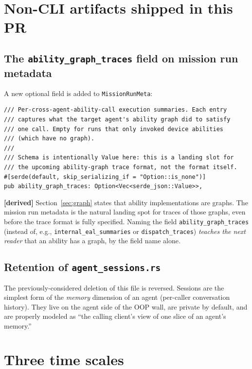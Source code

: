 \documentclass[11pt,a4paper]{article}
\newcommand{\derived}{\textcolor{derivedcolor}{\textbf{[derived]}}\xspace}
\begin{document}
\section{Non-CLI artifacts shipped in this PR}
\label{sec:non-cli}

\subsection{The \texttt{ability\_graph\_traces} field on mission run metadata}

A new optional field is added to \texttt{MissionRunMeta}:

\begin{lstlisting}
/// Per-cross-agent-ability-call execution summaries. Each entry
/// captures what the target agent's ability graph did to satisfy
/// one call. Empty for runs that only invoked device abilities
/// (which have no graph).
///
/// Schema is intentionally Value here: this is a landing slot for
/// the upcoming ability-graph trace format, not the format itself.
#[serde(default, skip_serializing_if = "Option::is_none")]
pub ability_graph_traces: Option<Vec<serde_json::Value>>,
\end{lstlisting}

\derived{} Section~\ref{sec:graph} states that ability implementations are
graphs. The mission run metadata is the natural landing spot for traces of
those graphs, even before the trace format is fully specified. Naming the
field \texttt{ability\_graph\_traces} (instead of, e.g.,
\texttt{internal\_eal\_summaries} or \texttt{dispatch\_traces}) \emph{teaches
the next reader} that an ability has a graph, by the field name alone.

\subsection{Retention of \texttt{agent\_sessions.rs}}

The previously-considered deletion of this file is reversed. Sessions are the
simplest form of the \emph{memory} dimension of an agent (per-caller
conversation history). They live on the agent side of the OOP wall, are
private by default, and are properly modeled as ``the calling client's view
of one slice of an agent's memory.''

\section{Three time scales}
\label{sec:time-scales}
\end{document}
